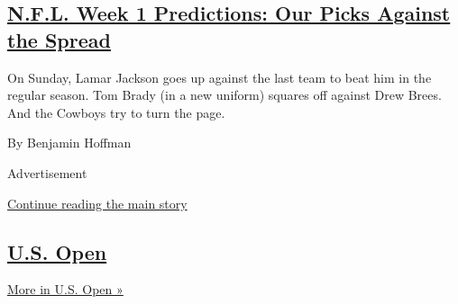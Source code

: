 \begin{enumerate}
  \hypertarget{nfl-week-1-predictions-our-picks-against-the-spread}{%
  \subsection{\texorpdfstring{\href{/2020/09/10/sports/football/nfl-picks-week-1.html}{N.F.L.
  Week 1 Predictions: Our Picks Against the
  Spread}}{N.F.L. Week 1 Predictions: Our Picks Against the Spread}}\label{nfl-week-1-predictions-our-picks-against-the-spread}}

  On Sunday, Lamar Jackson goes up against the last team to beat him in
  the regular season. Tom Brady (in a new uniform) squares off against
  Drew Brees. And the Cowboys try to turn the page.

  By Benjamin Hoffman
\end{enumerate}

Advertisement

\protect\hyperlink{after-mid1}{Continue reading the main story}

\hypertarget{us-open}{%
\subsection{\texorpdfstring{\href{/section/sports/tennis}{U.S.
Open}}{U.S. Open}}\label{us-open}}

\href{/section/sports/tennis}{More in U.S. Open »}

